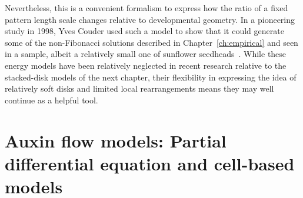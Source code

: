 Nevertheless, this is a convenient formalism to express how the ratio of a  fixed pattern  length scale changes relative to developmental geometry. In a pioneering study in 1998, Yves Couder used such a model to show that it could generate some of the non-Fibonacci solutions described in Chapter~\ref{ch:empirical} and seen in a sample, albeit a relatively small one of sunflower seedheads~\cite{couderInitialTransitionsOrder1998}. 
 While these energy models have been relatively neglected in recent research relative to the stacked-disk models of the next chapter, their flexibility 
 in expressing the idea of relatively soft disks and limited local rearrangements means they may well continue as a helpful tool. 

\section{Auxin flow models: Partial differential equation and cell-based models}
